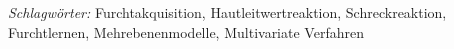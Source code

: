 	
\vspace*{0.5cm}
\noindent \textit{Schlagwörter:} Furchtakquisition, Hautleitwertreaktion, Schreckreaktion, Furchtlernen, Mehrebenenmodelle, Multivariate Verfahren








